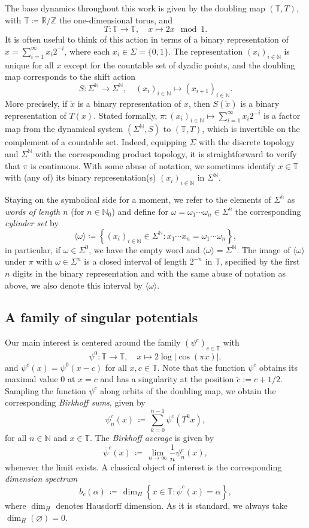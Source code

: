 \documentclass[11pt,reqno]{amsart}
\theoremstyle{plain}
\theoremstyle{definition}
\newcommand{\birk}{b}
\newcommand{\Z}{{\mathbb Z}}
\newcommand{\R}{{\mathbb R}}
\newcommand{\N}{{\mathbb N}}
\renewcommand{\emptyset}{\varnothing}
\newcommand{\TT}{\mathbb{T}}
\begin{document}
The base dynamics throughout this work is given by the doubling map $(\TT,T)$, with $\TT\coloneqq \R/\Z$ the one-dimensional torus, and 
\[
T \colon \TT \to \TT, \quad x \mapsto 2 x \mod 1 .
\]
It is often useful to think of this action in terms of a binary representation of $x = \sum_{i=1}^{\infty} x_i 2^{-i}$, where each $x_i \in \Sigma = \{0,1\}$. The representation $(x_i)_{i \in \N}$ is unique for all $x$ except for the countable set of dyadic points, and the doubling map corresponds to the shift action 
\[
S \colon \Sigma^{\N} \to \Sigma^{\N}, \quad
(x_i)_{i \in \N} \mapsto (x_{i+1})_{i \in \N}.
\]
More precisely, if $\tilde{x}$ is a binary representation of $x$, then $S(\tilde{x})$ is a binary representation of $T(x)$.  
Stated formally, $\pi \colon (x_i)_{i \in \N} \mapsto \sum_{i=1}^{\infty}x_i 2^{-i}$ is a factor map from the dynamical system $(\Sigma^{\N},S)$ to $(\TT,T)$, which is invertible on the complement of a countable set. Indeed, equipping $\Sigma$ with the discrete topology and $\Sigma^{\N}$ with the corresponding product topology, it is straightforward to verify that $\pi$ is continuous. With some abuse of notation, we sometimes identify $x \in \TT$ with (any of) its binary representation(s) $(x_i)_{i \in \N}$ in $\Sigma^{\N}$.

Staying on the symbolical side for a moment, we refer to the elements of $\Sigma^n$ as \emph{words of length $n$} (for $n \in \N_{0}$) and define for $\omega = \omega_1 \cdots \omega_n \in \Sigma^n$ the corresponding \emph{cylinder set} by
\[
\langle \omega \rangle \coloneqq \left\{(x_i)_{i \in \N} \in \Sigma^\N : x_1 \cdots x_n = \omega_1 \cdots \omega_n \right\},
\]
in particular, if $\omega\in \Sigma^0$, we have the empty word and $\langle \omega \rangle=\Sigma^\N$.
The image of $\langle \omega \rangle$ under $\pi$ with $\omega\in \Sigma^n$ is a closed interval of length $2^{-n}$ in $\TT$, specified by the first $n$ digits in the binary representation and with the same abuse of notation as above, we also denote this interval by $\langle \omega \rangle$.

\subsection{A family of singular potentials}
Our main interest is centered around the family $(\psi^c)_{c \in \TT}$ with
\[
\psi^0 \colon \TT \to \TT, 
\quad x \mapsto 2 \log|\cos(\pi x)|,
\]
and $\psi^c(x) = \psi^0(x-c)$ for all $x,c \in \TT$. Note that the function $\psi^c$ obtains its maximal value $0$ at $x=c$ and has a singularity at the position $\breve{c} := c + 1/2$. 
Sampling the function $\psi^c$ along orbits of the doubling map, we obtain the corresponding \emph{Birkhoff sums}, given by
\[
\psi_n^{c}(x)\, \coloneqq\, \sum_{k=0}^{n-1} \psi^c(T^k x),
\]
for all $n \in \N$ and $x \in \TT$. The \emph{Birkhoff average} is given by
\[
\overline{\psi}^{c}(x) \,\coloneqq\, \lim_{n \to \infty} \frac{1}{n} \psi^{c}_n(x),
\]
whenever the limit exists. A classical object of interest is the corresponding \emph{dimension spectrum}
\[
\birk_c(\alpha)\, \coloneqq \,\dim_H \left\{ x \in \TT : \overline{\psi}^c(x) = \alpha \right\},
\]
where $\dim_H$ denotes Hausdorff dimension. 
As it is standard, we always take $\dim_H(\emptyset)=0$. 
\end{document}
